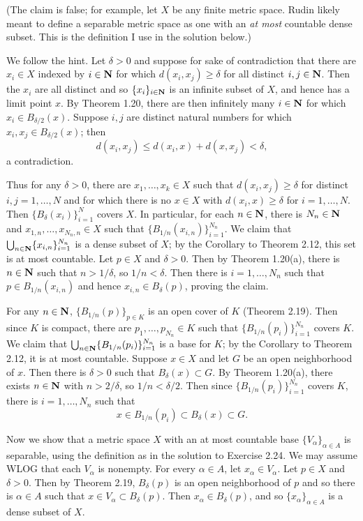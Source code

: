 \begin{ex}
(The claim is false; for example, let $X$ be any finite metric space. Rudin likely meant to define a separable metric space as one with an \emph{at most} countable dense subset. This is the definition I use in the solution below.)

We follow the hint. Let $\delta > 0$ and suppose for sake of contradiction that there are $x_i \in X$ indexed by $i \in \mathbf{N}$ for which $d(x_i, x_j) \geq \delta$ for all distinct $i, j \in \mathbf{N}$. Then the $x_i$ are all distinct and so $\{x_i\}_{i \in \mathbf{N}}$ is an infinite subset of $X$, and hence has a limit point $x$. By Theorem 1.20, there are then infinitely many $i \in \mathbf{N}$ for which $x_i \in B_{\delta/2}(x)$. Suppose $i, j$ are distinct natural numbers for which $x_i, x_j \in B_{\delta/2}(x)$; then \[d(x_i, x_j) \leq d(x_i, x) + d(x, x_j) < \delta,\] a contradiction.

Thus for any $\delta > 0$, there are $x_1, \ldots, x_k \in X$ such that $d(x_i, x_j) \geq \delta$ for distinct $i, j = 1, \ldots, N$ and for which there is no $x \in X$ with $d(x_i, x) \geq \delta$ for $i = 1, \ldots, N$. Then $\{B_{\delta}(x_i)\}_{i = 1}^N$ covers $X$. In particular, for each $n \in \mathbf{N}$, there is $N_n \in \mathbf{N}$ and $x_{1, n}, \ldots, x_{N_n, n} \in X$ such that $\{B_{1/n}(x_{i, n})\}_{i = 1}^{N_n}$. We claim that $\bigcup_{n \in \mathbf{N}}\{x_{i, n}\}_{i = 1}^{N_n}$ is a dense subset of $X$; by the Corollary to Theorem 2.12, this set is at most countable. Let $p \in X$ and $\delta > 0$. Then by Theorem 1.20(a), there is $n \in \mathbf{N}$ such that $n > 1/\delta$, so $1/n < \delta$. Then there is $i = 1, \ldots, N_n$ such that $p \in B_{1/n}(x_{i, n})$ and hence $x_{i, n} \in B_{\delta}(p)$, proving the claim.
\end{ex}

\begin{ex}
For any $n \in \mathbf{N}$, $\{B_{1/n}(p)\}_{p \in K}$ is an open cover of $K$ (Theorem 2.19). Then since $K$ is compact, there are $p_1, \ldots, p_{N_n} \in K$ such that $\{B_{1/n}(p_i)\}_{i = 1}^{N_n}$ covers $K$. We claim that $\bigcup_{n \in \mathbf{N}}\{B_{1/n}(p_i)\}_{i = 1}^{N_n}$ is a base for $K$; by the Corollary to Theorem 2.12, it is at most countable. Suppose $x \in X$ and let $G$ be an open neighborhood of $x$. Then there is $\delta > 0$ such that $B_{\delta}(x) \subset G$. By Theorem 1.20(a), there exists $n \in \mathbf{N}$ with $n > 2/\delta$, so $1/n < \delta/2$. Then since $\{B_{1/n}(p_i)\}_{i = 1}^{N_n}$ covers $K$, there is $i = 1, \ldots, N_n$ such that \[x \in B_{1/n}(p_i) \subset B_{\delta}(x) \subset G.\]

Now we show that a metric space $X$ with an at most countable base $\{V_{\alpha}\}_{\alpha \in A}$ is separable, using the definition as in the solution to Exercise 2.24. We may assume WLOG that each $V_{\alpha}$ is nonempty. For every $\alpha \in A$, let $x_{\alpha} \in V_{\alpha}$. Let $p \in X$ and $\delta > 0$. Then by Theorem 2.19, $B_{\delta}(p)$ is an open neighborhood of $p$ and so there is $\alpha \in A$ such that $x \in V_{\alpha} \subset B_{\delta}(p)$. Then $x_{\alpha} \in B_{\delta}(p)$, and so $\{x_{\alpha}\}_{\alpha \in A}$ is a dense subset of $X$.
\end{ex}

